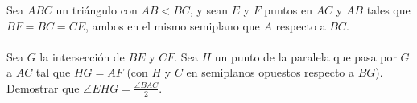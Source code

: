 Sea $ABC$ un triángulo con $AB < BC$, y sean $E$ y $F$ puntos en $AC$ y $AB$ tales que $BF = BC = CE$, ambos en el mismo semiplano que $A$ respecto a $BC$. \\\\
Sea $G$ la intersección de $BE$ y $CF$. Sea $H$ un punto de la paralela que pasa por $G$ a $AC$ tal que $HG = AF$ (con $H$ y $C$ en semiplanos opuestos respecto a $BG$). Demostrar que $\angle EHG = \frac{\angle BAC}{2}$.
